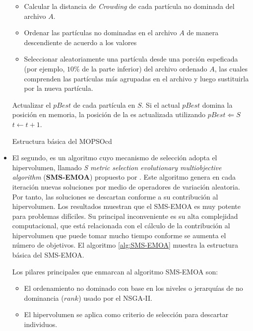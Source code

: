 \begin{itemize}
\begin{algorithm}
\begin{algorithmic}[1]
\begin{itemize}
	       \item Calcular la distancia de \textit{Crowding} de cada part\'icula no dominada del archivo $A$.
	       \item Ordenar las part\'iculas no dominadas en el archivo $A$ de manera descendiente de acuerdo a los valores 
	       \item Seleccionar aleatoriamente una part\'icula desde una porci\'on espeficada (por ejemplo, $10\%$ de la parte inferior) 
	       del archivo ordenado $A$, las cuales comprenden las part\'iculas m\'as agrupadas en el archivo y luego sustituirla por la 
	       nueva part\'icula.
	      \end{itemize}	  
	  \STATE Actualizar el $pBest$ de cada part\'icula en $S$. Si el actual $pBest$ domina la posici\'on en memoria, la posici\'on de la 
	  es actualizada utilizando $pBest \Leftarrow S$
	  \STATE $t \leftarrow t + 1$.
	\ENDWHILE
      \end{algorithmic}
  \caption{Estructura b\'asica del MOPSOcd}
  \label{alg:MOPSOcd}
  \end{algorithm}
 
 
  \item El segundo, es un algoritmo cuyo mecanismo de selecci\'on adopta el hipervolumen, llamado \textit{S metric selection 
  evolutionary multiobjective algorithm} (\textbf{SMS-EMOA}) propuesto 
  por \cite{Beume07}. Este algoritmo genera en cada iteraci\'on nuevas soluciones por medio de operadores de variaci\'on aleatoria. 
  Por tanto, las soluciones se descartan conforme a su contribuci\'on al hipervolumen. Los resultados muestran que el SMS-EMOA es muy 
  potente para problemas dif\'iciles. Su principal inconveniente es su alta complejidad computacional, que est\'a relacionada con el 
  c\'alculo de la contribuci\'on al hipervolumen que puede tomar mucho tiempo conforme se aumenta el n\'umero de objetivos.
   El algoritmo \ref{alg:SMS-EMOA} muestra la estructura b\'asica del SMS-EMOA.

   Los pilares principales que enmarcan al algoritmo SMS-EMOA son:
   
   \begin{itemize}
    \item El ordenamiento no dominado con base en los niveles o jerarqu\'ias de no dominancia ($rank$) usado por el NSGA-II.
    \item El hipervolumen se aplica como criterio de selecci\'on para descartar individuos.
   \end{itemize}
  

\end{itemize}
